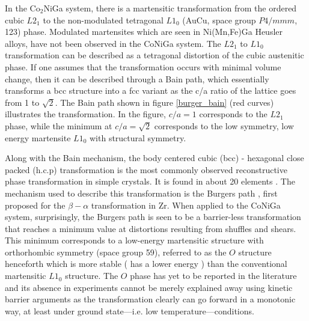 \documentclass[%
preprint,
 amsmath,amssymb,
 aps,
prb,
showkeys,
]{revtex4-1}
\begin{document}
In the Co$_2$NiGa system, there is a martensitic transformation from the ordered cubic $L2_1$ to the non-modulated tetragonal $L1_0$ (AuCu, space group $P4/mmm$, 123) phase.  Modulated martensites which are seen in Ni(Mn,Fe)Ga Heusler alloys, have not been observed in the CoNiGa system\cite{Liu2006145, fichtner2015effects}. The $L2_1$ to $L1_0$ transformation can be described as a tetragonal distortion of the cubic austenitic phase. If one assumes that the transformation occurs with minimal volume change, then it can be described through a Bain path, which essentially transforms a bcc structure into a fcc variant as the c/a ratio of the lattice goes from 1 to $\sqrt{2}$. The Bain path shown in figure \ref{burger_bain} (red curves) illustrates the transformation. In the figure, $c/a=1$ corresponds to the $L2_1$ phase, while the minimum at $c/a = \sqrt{2}$ corresponds to the low symmetry, low energy martensite $L1_0$ with structural symmetry.  

Along with the Bain mechanism, the body centered cubic (bcc) - hexagonal close packed (h.c.p) transformation is the most commonly observed reconstructive phase transformation in simple crystals. It is  found in about 20 elements \cite{toledano1996reconstructive}.  The mechanism used to describe this transformation is the Burgers path \cite{burger1934}, first proposed for the $\beta - \alpha$ transformation in Zr. When applied to the CoNiGa system, surprisingly, the Burgers path is seen to be a barrier-less transformation that reaches a minimum value at distortions resulting from shuffles and shears. This minimum corresponds to a low-energy martensitic structure  with orthorhombic symmetry (space group 59), referred to as the $O$ structure henceforth which is more stable  ( has a lower energy ) than the conventional martensitic $L1_0$ structure. The $O$ phase has yet to be reported in the literature and its absence in experiments cannot be merely explained away using kinetic barrier arguments as the 
transformation clearly can go forward  in a monotonic way, at least under ground state---i.e. low temperature---conditions.
\end{document}
